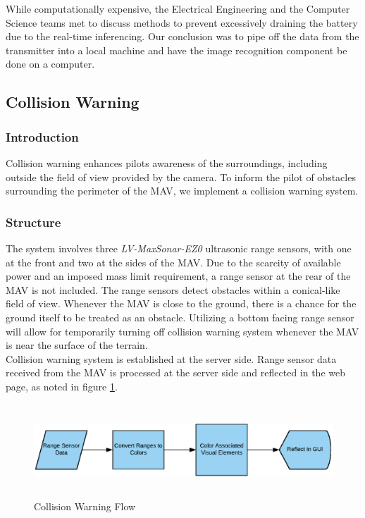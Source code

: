 \documentclass[onecolumn, oneside, letterpaper, draftclsnofoot, 10pt, compsoc]{IEEEtran}
\begin{document}
While computationally expensive, the Electrical Engineering and the Computer Science teams met to discuss methods to prevent excessively draining the battery due to the real-time inferencing. Our conclusion was to pipe off the data from the transmitter into a local machine and have the image recognition component be done on a computer.


\subsection{Collision Warning}
\subsubsection{Introduction}
Collision warning enhances pilot\textquotesingle s awareness of the surroundings, including outside the field of view provided by the camera. To inform the pilot of obstacles surrounding the perimeter of the MAV, we implement a collision warning system.

\subsubsection{Structure}
The system involves three \textit{LV-MaxSonar-EZ0} ultrasonic range sensors, with one at the front and two at the sides of the MAV. Due to the scarcity of available power and an imposed mass limit requirement, a range sensor at the rear of the MAV is not included. The range sensors detect obstacles within a conical-like field of view. Whenever the MAV is close to the ground, there is a chance for the ground itself to be treated as an obstacle. Utilizing a bottom facing range sensor will allow for temporarily turning off collision warning system whenever the MAV is near the surface of the terrain. \\

Collision warning system is established at the server side. Range sensor data received from the MAV is processed at the server side and reflected in the web page, as noted in figure \ref{fig:ColWar}.
\begin{figure}[h]
    \centering
    \includegraphics[height=3.5cm]{graphics/collision_warning.eps}
    \caption{Collision Warning Flow}
    \label{fig:ColWar}
\end{figure}
\end{document}

